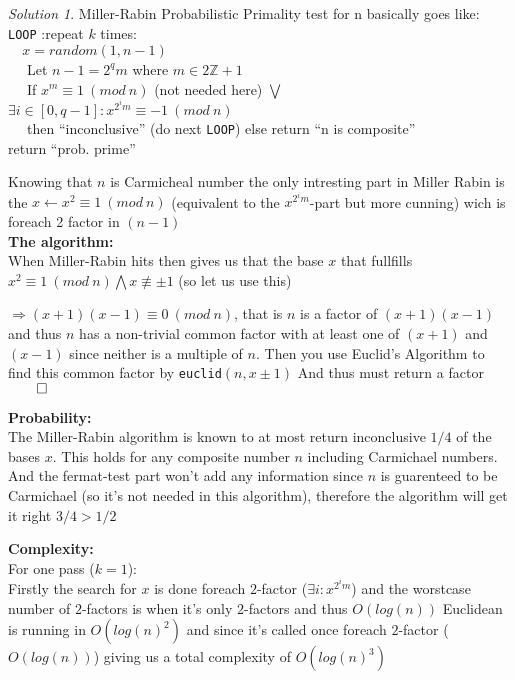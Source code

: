 \documentclass[a4paper,twoside=false,abstract=false,numbers=noenddot,
titlepage=false,headings=small,parskip=half,version=last]{scrartcl}
\theoremstyle{definition}
\theoremstyle{remark}
\newtheorem*{solution}{Solution}
\newcommand{\ZZ}{\ensuremath{\mathbb{Z}}}
\begin{document}
\begin{solution}
   Miller-Rabin Probabilistic Primality test for n basically goes like: \\
   \verb+LOOP+ :repeat $k$ times:\\
   \verb+  + $x = random(1,n-1)$ \\
   \verb+  + Let $n-1 = 2^qm$ where $m \in 2\ZZ+1$ \\
   \verb+  + If $x^m \equiv 1 \ (mod \ n)$ (not needed here)
         $\bigvee$ 
         $\exists i \in [0,q-1]:x^{2^im} \equiv -1 \ (mod \ n)$ \\
   \verb+  + then ``inconclusive'' (do next \verb+LOOP+) else return ``n is composite'' \\
   return ``prob. prime''


   Knowing that $n$ is Carmicheal number the only intresting part in Miller Rabin is the $x \leftarrow x^2 \equiv 1 \ (mod \ n)$ (equivalent to the $x^{2^im}$-part but more cunning) wich is foreach 2 factor in $(n-1)$ \\
   
   {\bf The algorithm:} \\
   When Miller-Rabin hits then gives us that the base $x$ that fullfills 
   $x^2 \equiv 1 \ (mod \ n) \bigwedge x \not\equiv \pm 1$ (so let us use this)
   
   $\Rightarrow (x+1)(x-1) \equiv 0 \ (mod \ n)$, that is $n$ is a factor of $(x+1)(x-1)$
   and thus $n$ has a non-trivial common factor with at least one of $(x+1)$ and $(x-1)$
   since neither is a multiple of $n$. Then you use Euclid's Algorithm to find this common factor by \verb+euclid+$(n,x \pm 1)$
   And thus must return a factor $\qed$

   {\bf Probability: } \\
   The Miller-Rabin algorithm is known to at most return inconclusive $1/4$ of the bases $x$.
   This holds for any composite number $n$ including Carmichael numbers.
   And the fermat-test part won't add any information since $n$ 
   is guarenteed to be Carmichael (so it's not needed in this algorithm),
   therefore the algorithm will get it right \underline{$3/4>1/2$}

   {\bf Complexity: } \\
   For one pass ($k=1$):\\
   Firstly the search for $x$ is done foreach $2$-factor ($\exists i:x^{2^im}$) and the worstcase number of $2$-factors is when it's only $2$-factors and thus $O(log(n))$
   Euclidean is running in $O(log(n)^2)$ and since it's called once foreach $2$-factor ($O(log(n))$) giving us a total complexity of \underline{$O(log(n)^3)$}
   

\end{solution}
\end{document}
